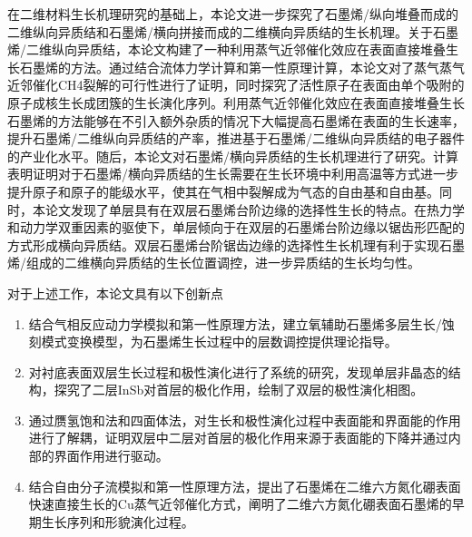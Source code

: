 在二维材料生长机理研究的基础上，本论文进一步探究了石墨烯/纵向堆叠而成的二维纵向异质结和石墨烯/横向拼接而成的二维横向异质结的生长机理。关于石墨烯/二维纵向异质结，本论文构建了一种利用蒸气近邻催化效应在表面直接堆叠生长石墨烯的方法。通过结合流体力学计算和第一性原理计算，本论文对了蒸气蒸气近邻催化CH4裂解的可行性进行了证明，同时探究了活性原子在表面由单个吸附的原子成核生长成团簇的生长演化序列。利用蒸气近邻催化效应在表面直接堆叠生长石墨烯的方法能够在不引入额外杂质的情况下大幅提高石墨烯在表面的生长速率，提升石墨烯/二维纵向异质结的产率，推进基于石墨烯/二维纵向异质结的电子器件的产业化水平。随后，本论文对石墨烯/横向异质结的生长机理进行了研究。计算表明证明对于石墨烯/横向异质结的生长需要在生长环境中利用高温等方式进一步提升原子和原子的能级水平，使其在气相中裂解成为气态的自由基和自由基。同时，本论文发现了单层具有在双层石墨烯台阶边缘的选择性生长的特点。在热力学和动力学双重因素的驱使下，单层倾向于在双层的石墨烯台阶边缘以锯齿形匹配的方式形成横向异质结。双层石墨烯台阶锯齿边缘的选择性生长机理有利于实现石墨烯/组成的二维横向异质结的生长位置调控，进一步异质结的生长均匀性。

对于上述工作，本论文具有以下创新点\chinesecolon
\begin{enumerate}[labelsep=0em,label=（\arabic*）,wide]
    \item 结合气相反应动力学模拟和第一性原理方法，建立氧辅助石墨烯多层生长/蚀刻模式变换模型，为石墨烯生长过程中的层数调控提供理论指导。
    \item 对衬底表面双层生长过程和极性演化进行了系统的研究，发现单层非晶态的结构，探究了二层InSb对首层的极化作用，绘制了双层的极性演化相图。
    \item 通过赝氢饱和法和四面体法，对生长和极性演化过程中表面能和界面能的作用进行了解耦，证明双层中二层对首层的极化作用来源于表面能的下降并通过内部的界面作用进行驱动。
    \item 结合自由分子流模拟和第一性原理方法，提出了石墨烯在二维六方氮化硼表面快速直接生长的Cu蒸气近邻催化方式，阐明了二维六方氮化硼表面石墨烯的早期生长序列和形貌演化过程。
\end{enumerate}

